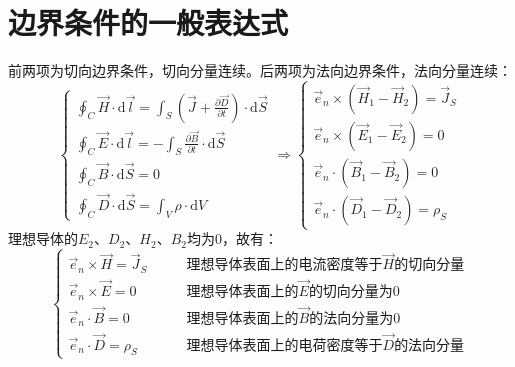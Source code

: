 \section{边界条件的一般表达式}
前两项为切向边界条件，切向分量连续。后两项为法向边界条件，法向分量连续：
$$\left\{
\begin{aligned}
	\oint_C\vec{H}\cdot\mathrm{d}\vec{l} = \int_S(\vec{J}+\frac{\partial \vec{D}}{\partial t})\cdot\mathrm{d}\vec{S} \\
	\oint_C\vec{E}\cdot\mathrm{d}\vec{l} = -\int_S\frac{\partial \vec{B}}{\partial t}\cdot\mathrm{d}\vec{S} \\
	\oint_C\vec{B}\cdot\mathrm{d}\vec{S} = 0 \\
	\oint_C\vec{D}\cdot\mathrm{d}\vec{S} = \int_V\rho\cdot\mathrm{d}V 
\end{aligned}
\right.\Rightarrow\left\{
\begin{aligned}
	\vec{e}_n \times (\vec{H}_1 - \vec{H}_2) = \vec{J}_S \\
	\vec{e}_n \times (\vec{E}_1 - \vec{E}_2) = 0 \\
	\vec{e}_n \cdot (\vec{B}_1 - \vec{B}_2) = 0 \\
	\vec{e}_n \cdot (\vec{D}_1 - \vec{D}_2) = \rho_S
\end{aligned}
\right.$$
理想导体的$E_2$、$D_2$、$H_2$、$B_2$均为0，故有：
$$\left\{
\begin{aligned}
	\vec{e}_n \times \vec{H} = \vec{J}_S&\qquad\text{理想导体表面上的电流密度等于}\vec{H}\text{的切向分量} \\
	\vec{e}_n \times \vec{E} = 0 &\qquad\text{理想导体表面上的}\vec{E}\text{的切向分量为0}\\
	\vec{e}_n \cdot \vec{B} = 0 &\qquad\text{理想导体表面上的}\vec{B}\text{的法向分量为0}\\
	\vec{e}_n \cdot \vec{D} = \rho_S&\qquad\text{理想导体表面上的电荷密度等于}\vec{D}\text{的法向分量}
\end{aligned}
\right.$$







